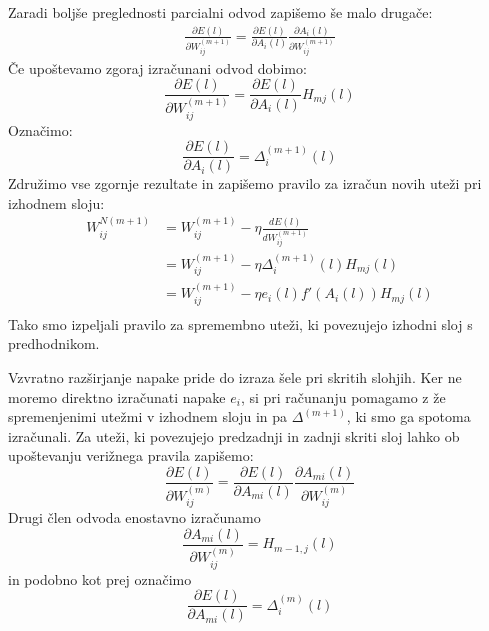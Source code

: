 \documentclass[mat1]{fmfdelo}
\begin{document}
Zaradi boljše preglednosti parcialni odvod zapišemo še malo drugače:
\begin{equation*}
\begin{aligned}
\frac{\partial E(l)}{\partial W^{(m+1)}_{ij}} = \frac{\partial E(l)}{\partial A_i(l)}\frac{\partial A_i(l)}{\partial W^{(m+1)}_{ij}} 
\end{aligned}
\end{equation*}
%
Če upoštevamo zgoraj izračunani odvod dobimo: 
%
\begin{equation*}
\frac{\partial E(l)}{\partial W^{(m+1)}_{ij}} = \frac{\partial E(l)}{\partial A_i(l)}H_{mj}(l) 
\end{equation*}
%
Označimo: 
%
\begin{equation}
\frac{\partial E(l)}{\partial A_i(l)} = \Delta^{(m+1)}_i(l)
\label{eq:deltaY}
\end{equation}
%
Združimo vse zgornje rezultate in zapišemo pravilo za izračun novih uteži pri izhodnem sloju:
%
\begin{equation}
\begin{aligned}
W^{N(m+1)}_{ij} &= W ^{(m+1)}_{ij}- \eta \frac{dE(l)}{dW_{ij}^{(m+1)}} \\
&= W ^{(m+1)}_{ij} -\eta  \Delta^{(m+1)}_i (l)H_{mj}(l)\\
&= W ^{(m+1)}_{ij} -\eta e_i(l) f'(A_i(l))H_{mj}(l)\\
\end{aligned}
\end{equation}
%
Tako smo izpeljali pravilo za spremembno uteži, ki povezujejo izhodni sloj s predhodnikom. 

Vzvratno razširjanje napake pride do izraza šele pri skritih slohjih. Ker ne moremo direktno izračunati napake $e_i$, si pri računanju pomagamo z že spremenjenimi utežmi v izhodnem sloju in pa $\Delta^{(m+1)}$, ki smo ga spotoma izračunali. Za uteži, ki povezujejo predzadnji in zadnji skriti sloj lahko ob upoštevanju verižnega pravila zapišemo:
%
\begin{equation*}
 \frac{\partial E(l)}{\partial W^{(m)}_{ij}} = \frac{\partial E(l)}{\partial A_{mi}(l)} \frac{\partial A_{mi}(l)}{\partial W^{(m)}_{ij}}
\end{equation*}
%
%
Drugi člen odvoda enostavno izračunamo
\begin{equation*}
\frac{\partial A_{mi}(l)}{\partial W^{(m)}_{ij}} = H_{m-1,j}(l)
\end{equation*}
%
in podobno kot prej označimo
%
\begin{equation*}
\frac{\partial E(l)}{\partial A_{mi}(l)} = \Delta^{(m)}_i(l)
\end{equation*}
\end{document}
